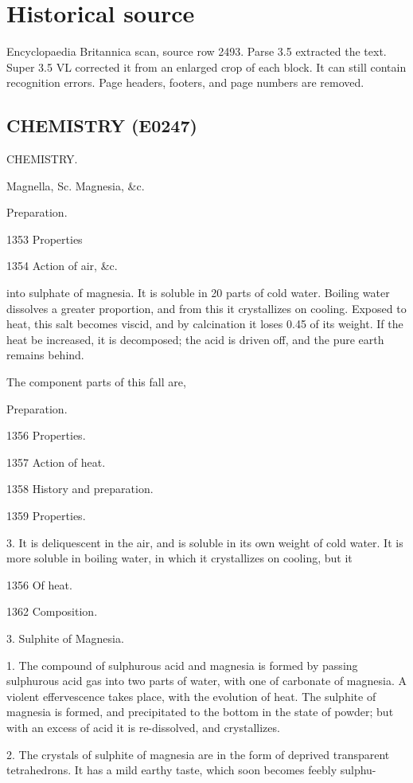 \documentclass{article}
\begin{document}
\section*{Historical source}
Encyclopaedia Britannica scan, source row 2493. Parse 3.5 extracted the text. Super 3.5 VL corrected it from an enlarged crop of each block. It can still contain recognition errors.
Page headers, footers, and page numbers are removed.

\subsection*{CHEMISTRY (E0247)}
CHEMISTRY.

Magnella,
Sc.
Magnesia,
\&c.

Preparation.

1353
Properties

1354
Action of
air, \&c.

into sulphate of magnesia. It is soluble in 20 parts of cold water. Boiling water dissolves a greater proportion, and from this it crystallizes on cooling. Exposed to heat, this salt becomes viscid, and by calcination it loses 0.45 of its weight. If the heat be increased, it is decomposed; the acid is driven off, and the pure earth remains behind.

The component parts of this fall are,

Preparation.

1356
Properties.

1357
Action of
heat.

1358
History and preparation.

1359
Properties.

3. It is deliquescent in the air, and is soluble in its own weight of cold water. It is more soluble in boiling water, in which it crystallizes on cooling, but it

1356
Of heat.

1362
Composition.

3. Sulphite of Magnesia.

1. The compound of sulphurous acid and magnesia is formed by passing sulphurous acid gas into two parts of water, with one of carbonate of magnesia. A violent effervescence takes place, with the evolution of heat. The sulphite of magnesia is formed, and precipitated to the bottom in the state of powder; but with an excess of acid it is re-dissolved, and crystallizes.

2. The crystals of sulphite of magnesia are in the form of deprived transparent tetrahedrons. It has a mild earthy taste, which soon becomes feebly sulphu-
\end{document}
